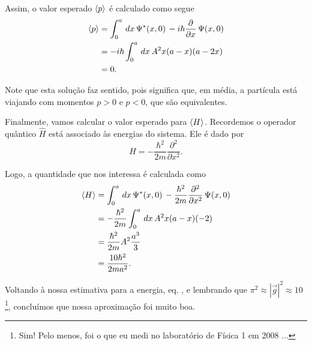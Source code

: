 \documentclass[red]{mecanica_quantica}
\begin{document}
	 Assim, o valor esperado $\langle p\rangle$ é calculado como segue
	 \begin{align}
	 \label{eq:p0esp}
	 	\langle p\rangle & = \int_{0}^{a} \, dx \,  \Psi^*(x,0) \, -i\hbar \frac{\partial}{\partial x} \,  \Psi(x,0) \nonumber \\
	 	& = -i\hbar \int_{0}^{a} \, dx \, A^2 x(a-x)(a-2x) \nonumber \\
	 	& = 0.
	 \end{align}
	 
	 Note que esta solução faz sentido, pois significa que, em média, a partícula está viajando com momentos $p > 0$ e $p < 0$, que são equivalentes.
	 
	 Finalmente, vamos calcular o valor esperado para $\langle H\rangle$. Recordemos o operador quântico $\hat{H}$ está associado às energias do sistema. Ele é dado por
	 \begin{equation}
	 	\label{eq:operadorH}
	 	H = -\frac{\hbar^2}{2m} \frac{\partial^2}{\partial x^2}.
	 \end{equation}
	 
	 Logo, a quantidade que nos interessa é calculada como
	 \begin{align}
	 \label{eq:E0esp}
	 	\langle H\rangle & = \int_{0}^{a} \, dx \,  \Psi^*(x,0) \, -\frac{\hbar^2}{2m} \frac{\partial^2}{\partial x^2} \,  \Psi(x,0) \nonumber \\
	 	& =-\frac{\hbar^2}{2m} \int_{0}^{a} \, dx \, A^2 x(a-x)(-2) \nonumber \\
	 	& = \frac{\hbar^2}{2m} A^2 \frac{a^3}{3} \nonumber \\
	 	& = \frac{10 \hbar^2}{2m a^2}.
	 \end{align}	 
	 
	 Voltando à nossa estimativa para a energia, eq. , e lembrando que $\pi^2 \approx |\vec{g}|^2 \approx 10$ \footnote{Sim! Pelo menos, foi o que eu medi no laboratório de Física 1 em 2008 ...}, concluímos que nossa aproximação foi muito boa.
	 
\end{document}
